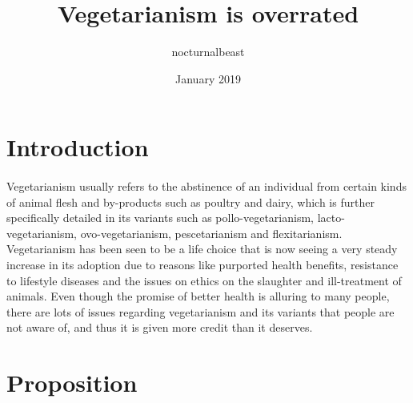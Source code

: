 \documentclass{article}
\title{Vegetarianism is overrated}
\author{nocturnalbeast}
\date{January 2019}
\begin{document}
\maketitle

\section{Introduction}
\paragraph{} Vegetarianism usually refers to the abstinence of an individual from certain kinds of animal flesh and by-products such as poultry and dairy, which is further specifically detailed in its variants such as pollo-vegetarianism, lacto-vegetarianism, ovo-vegetarianism, pescetarianism and flexitarianism. Vegetarianism has been seen to be a life choice that is now seeing a very steady increase in its adoption due to reasons like purported health benefits, resistance to lifestyle diseases and the issues on ethics on the slaughter and ill-treatment of animals. Even though the promise of better health is alluring to many people, there are lots of issues regarding vegetarianism and its variants that people are not aware of, and thus it is given more credit than it deserves.

\section{Proposition}
\end{document}
